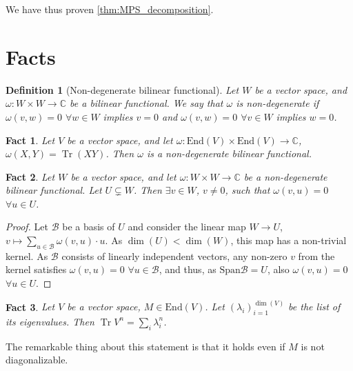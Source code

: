 \documentclass{article}
\newtheorem{fact}{Fact}
\newtheorem{definition}{Definition}
\newcommand{\tr}{\operatorname{Tr}}
\newcommand{\End}{\mathrm{End}}
\newcommand{\Span}{\mathrm{Span}}
\begin{document}
We have thus proven \cref{thm:MPS_decomposition}.  

\appendix

\section{Facts}

\begin{definition}[Non-degenerate bilinear functional]\label{def:nondegen_bili_fcnl}
  Let $W$ be a vector space, and $\omega: W\times W\to \mathbb{C}$ be a bilinear functional.
  We say that $\omega$ is non-degenerate if $\omega(v,w) = 0$ $\forall w\in W$ implies $v=0$ and $\omega(v,w) = 0$ $\forall v\in W$ implies $w=0$.
\end{definition}

\begin{fact}\label{fact:tr_nondegen}
  Let $V$ be a vector space, and let $\omega: \End(V)\times\End(V)\to \mathbb{C}$, $\omega(X,Y)= \tr(XY)$. Then $\omega$ is a non-degenerate bilinear functional.
\end{fact}


\begin{fact}
  Let $W$ be a vector space, and let $\omega: W\times W\to \mathbb{C}$ be a non-degenerate bilinear functional. Let $U\subsetneq W$. Then $\exists v\in W$, $v\neq 0$, such that  $\omega(v,u) =0$ $\forall u\in U$.
\end{fact}

\begin{proof}
   Let $\mathcal{B}$ be a basis of $U$ and consider the linear map $W\to U$, $v \mapsto \sum_{u\in \mathcal{B}} \omega(v,u) \cdot u$. As $\dim(U) < \dim(W)$, this map has a non-trivial kernel. As $\mathcal{B}$ consists of linearly independent vectors, any non-zero $v$ from the kernel satisfies $\omega(v,u) = 0$ $\forall u\in\mathcal{B}$, and thus, as $\Span \mathcal{B} = U$, also $\omega(v,u) = 0$ $\forall u \in U$.    
\end{proof}

\begin{fact}\label{fact:trace_eigen}
  Let $V$ be a vector space, $M\in \End(V)$. Let $(\lambda_i)_{i=1}^{\dim(V)}$ be the list of its eigenvalues. Then $\tr V^n = \sum_i \lambda_i^n$.
\end{fact}

The remarkable thing about this statement is that it holds even if $M$ is not diagonalizable. 
\end{document}
